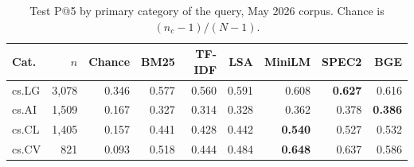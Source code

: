 \begin{table}[!t]
\centering
\caption{Test P@5 by primary category of the query, May 2026 corpus. Chance is $(n_c-1)/(N-1)$.}
\label{tab:bycat}
\scriptsize
\setlength{\tabcolsep}{2.8pt}
\begin{tabular}{@{}lrrrrrrrr@{}}
\toprule
Cat. & $n$ & Chance & BM25 & TF-IDF & LSA & MiniLM & SPEC2 & BGE \\
\midrule
cs.LG & 3{,}078 & 0.346 & 0.577 & 0.560 & 0.591 & 0.608 & \textbf{0.627} & 0.616 \\
cs.AI & 1{,}509 & 0.167 & 0.327 & 0.314 & 0.328 & 0.362 & 0.378 & \textbf{0.386} \\
cs.CL & 1{,}405 & 0.157 & 0.441 & 0.428 & 0.442 & \textbf{0.540} & 0.527 & 0.532 \\
cs.CV & 821 & 0.093 & 0.518 & 0.444 & 0.484 & \textbf{0.648} & 0.637 & 0.586 \\
\bottomrule
\end{tabular}
\end{table}
